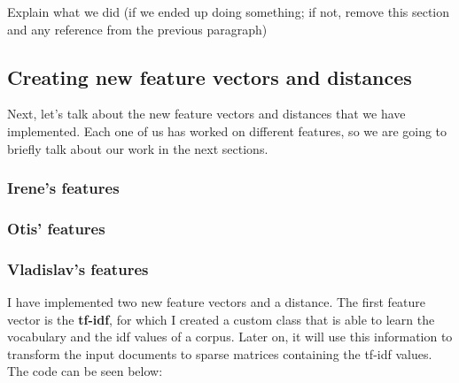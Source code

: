 \documentclass[11pt,a4paper]{article}
\begin{document}
Explain what we did (if we ended up doing something; if not, remove this section
and any reference from the previous paragraph)

\subsection{Creating new feature vectors and distances}

Next, let's talk about the new feature vectors and distances that we have implemented.
Each one of us has worked on different features, so we are going to briefly talk about
our work in the next sections.

\subsubsection{Irene's features}

\subsubsection{Otis' features}

\subsubsection{Vladislav's features}

I have implemented two new feature vectors and a distance. The first feature vector
is the \textbf{tf-idf}, for which I created a custom class that is able to learn the
vocabulary and the idf values of a corpus. Later on, it will use this
information to transform the input documents to sparse matrices containing the
tf-idf values. The code can be seen below:
\end{document}
